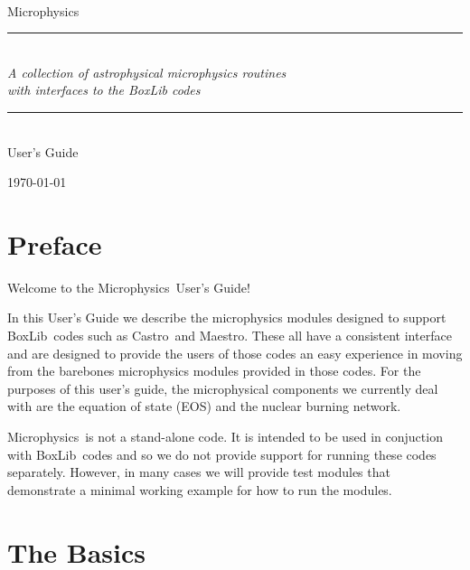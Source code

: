 \documentclass[11pt]{book}
\newcommand{\HRule}{\rule{\linewidth}{0.125mm}}
\renewcommand{\chaptermark}[1]{%
 \markboth{\chaptername
\ \thechapter.\ #1}{}}
\newcommand{\castro}{{\sf Castro}}
\newcommand{\maestro}{{\sf Maestro}}
\newcommand{\boxlib}{{\sf BoxLib}}
\newcommand{\microphysics}{{\sf Microphysics}}
\begin{document}
\frontmatter

\begin{titlepage}
\begin{center}
\ \\[3in]
{\sf \Huge Microphysics} 

\begin{minipage}{5.5in}
\HRule\\[2mm]
\centering
{\Large \em A collection of astrophysical microphysics routines \\ with interfaces to the BoxLib codes}

\HRule
\end{minipage}

\ \\[1 in]
{\sf \huge User's Guide}

\vfill

{\large \today}
\end{center}

\end{titlepage}



\setcounter{tocdepth}{2}
\tableofcontents

\clearpage

\chapter*{Preface}
\chaptermark{Preface}

Welcome to the \microphysics\ User's Guide!

In this User's Guide we describe the microphysics modules designed to
support \boxlib\ codes such as \castro\ and \maestro. These all have a
consistent interface and are designed to provide the users of those
codes an easy experience in moving from the barebones microphysics
modules provided in those codes. For the purposes of this user's
guide, the microphysical components we currently deal with are the
equation of state (EOS) and the nuclear burning network.

\microphysics\ is not a stand-alone code. It is intended to be used in
conjuction with \boxlib\ codes and so we do not provide support for
running these codes separately.  However, in many cases we will
provide test modules that demonstrate a minimal working example for
how to run the modules.

\clearpage

\mainmatter


\chapter{The Basics}
\end{document}
